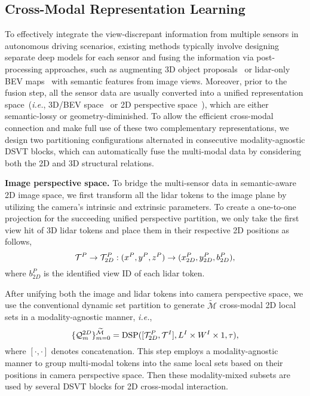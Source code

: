 \documentclass[10pt,twocolumn,letterpaper]{article}
\begin{document}
\subsection{Cross-Modal Representation Learning} \label{sec:cross-modal}
To effectively integrate the view-discrepant information from multiple sensors in autonomous driving scenarios, existing methods typically involve designing separate deep models for each sensor and fusing the information via post-processing approaches, such as augmenting 3D object proposals~\cite{bai2022transfusion} or lidar-only BEV maps~\cite{liu2022bevfusion,liang2022bevfusion} with semantic features from image views. Moreover, prior to the fusion step, all the sensor data are usually converted into a unified representation space~(\emph{i.e.}, 3D/BEV space~\cite{liu2022bevfusion,liang2022bevfusion} or 2D perspective space~\cite{bai2022transfusion,yang2022boosting}), which are either semantic-lossy or geometry-diminished. To allow the efficient cross-modal connection and make full use of these two complementary representations, we design two partitioning configurations alternated in consecutive modality-agnostic DSVT blocks, which can automatically fuse the multi-modal data by considering both the 2D and 3D structural relations.

\noindent \textbf{Image perspective space.} To bridge the multi-sensor data in semantic-aware 2D image space, we first transform all the lidar tokens to the image plane by utilizing the camera's intrinsic and extrinsic parameters. To create a one-to-one projection for the succeeding unified perspective partition, we only take the first view hit of 3D lidar tokens and place them in their respective 2D positions as follows,
\vspace{-2pt}
\begin{equation}
\mathcal{T}^P \rightarrow \mathcal{T}^P_{2D}: (x^P, y^P, z^P) \rightarrow (x_{2D}^{P}, y_{2D}^{P}, b_{2D}^{P}),
\vspace{-2pt}
\end{equation}
where $b_{2D}^{P}$ is the identified view ID of each lidar token.

After unifying both the image and lidar tokens into camera perspective space, we use the conventional dynamic set partition to generate $\widetilde{\mathcal{M}}$ cross-modal 2D local sets in a modality-agnostic manner, \textit{i.e.},
\vspace{-2pt}
\begin{equation}
\{\mathcal{Q}^{2D}_m\}_{m=0}^{\widetilde{\mathcal{M}}}  = \text{DSP}([\mathcal{T}^P_{2D}, \mathcal{T}^I], L^I \times W^I \times 1, \tau),
\vspace{-2pt}
\end{equation}
where $[\cdot, \cdot]$ denotes concatenation. This step employs a modality-agnostic manner to group multi-modal tokens into the same local sets based on their positions in camera perspective space. Then these modality-mixed subsets are used by several DSVT blocks for 2D cross-modal interaction.
\end{document}
